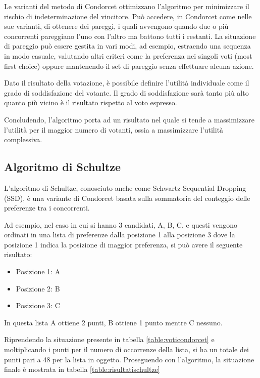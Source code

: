 \documentclass[12pt,a4paper,openright,twoside]{book}
\begin{document}
Le varianti del metodo di Condorcet ottimizzano l'algoritmo per minimizzare il rischio
di indeterminazione del vincitore.
Può accedere, in Condorcet come nelle sue varianti, di ottenere dei pareggi,
i quali avvengono quando due o più concorrenti pareggiano l'uno con l'altro ma 
battono tutti i restanti. La situazione di pareggio può essere gestita in vari
modi, ad esempio, estraendo una sequenza in modo casuale, valutando altri criteri
come la preferenza nei singoli voti (most first choice) oppure mantenendo il set di pareggio
senza effettuare alcuna azione.

Dato il risultato della votazione, è possibile definire l'utilità individuale come il grado
di soddisfazione del votante. Il grado di soddisfazione sarà tanto più alto 
quanto più vicino è il risultato rispetto al voto espresso.

Concludendo, l'algoritmo porta ad un risultato nel quale si tende a massimizzare
l'utilità per il maggior numero di votanti, ossia a massimizzare l'utilità
complessiva. 

\subsection{Algoritmo di Schultze}
L'algoritmo di Schultze, conosciuto anche come Schwartz Sequential Dropping (SSD),
è una variante di Condorcet basata sulla sommatoria del conteggio delle preferenze tra i concorrenti.

Ad esempio, nel caso in cui si hanno 3 candidati, A, B, C,
e questi vengono ordinati in una lista di preferenze dalla posizione 1 alla posizione 3 dove la posizione 1 
indica la posizione di maggior preferenza, si può avere il seguente risultato:
\begin{itemize}
    \item{Posizione 1: A}
    \item{Posizione 2: B}
    \item{Posizione 3: C}
\end{itemize}    
In questa lista A ottiene 2 punti, B ottiene 1 punto mentre C nessuno.

Riprendendo la situazione presente in tabella \ref{table:voticondorcet} e moltiplicando
i punti per il numero di occorrenze della lista, si ha un totale dei punti pari a 48
per la lista in oggetto. Proseguendo con l'algoritmo, la situazione finale è mostrata in tabella \ref{table:risultatischultze}
\end{document}
